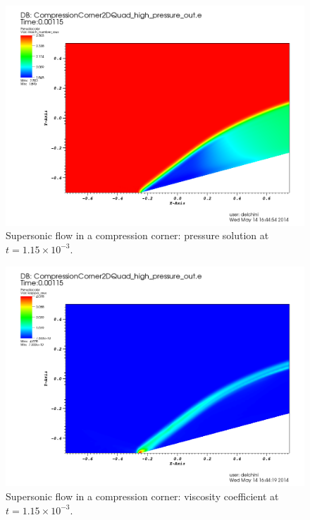           \begin{figure}[H]%
                \centering
                \includegraphics[width=\textwidth]{figures/CCDensityTime0p00115.png}
                \caption{Supersonic flow in a compression corner: pressure solution at $t=1.15 \times 10^{-3}$.}
                \label{fig:2d_cpc_rho_115}
        \end{figure}%
        \begin{figure}[H]%
                \centering
                \includegraphics[width=\textwidth]{figures/CCViscosityTime0p00115.png}
                \caption{Supersonic flow in a compression corner: viscosity coefficient at $t=1.15 \times 10^{-3}$.}
                \label{fig:2d_cpc_visc_115}
        \end{figure}
